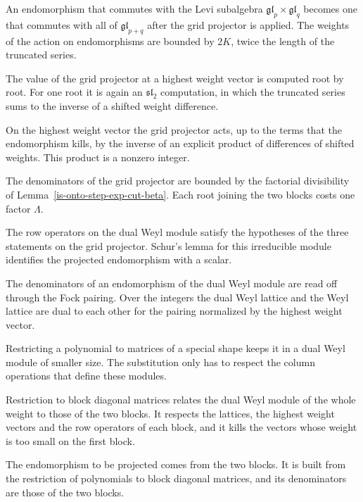 An endomorphism that commutes with the Levi subalgebra $\mathfrak{gl}_p\times\mathfrak{gl}_q$ becomes
one that commutes with all of $\mathfrak{gl}_{p+q}$ after the grid projector is applied. The weights
of the action on endomorphisms are bounded by $2K$, twice the length of the truncated series.

The value of the grid projector at a highest weight vector is computed root by root. For one root it
is again an $\mathfrak{sl}_2$ computation, in which the truncated series sums to the inverse of a
shifted weight difference.

On the highest weight vector the grid projector acts, up to the terms that the endomorphism kills, by
the inverse of an explicit product of differences of shifted weights. This product is a nonzero
integer.

The denominators of the grid projector are bounded by the factorial divisibility of
Lemma~\ref{is-onto-step-exp-cut-beta}. Each root joining the two blocks costs one factor $\Lambda$.

The row operators on the dual Weyl module satisfy the hypotheses of the three statements on the grid
projector. Schur's lemma for this irreducible module identifies the projected endomorphism with a
scalar.

The denominators of an endomorphism of the dual Weyl module are read off through the Fock pairing.
Over the integers the dual Weyl lattice and the Weyl lattice are dual to each other for the pairing
normalized by the highest weight vector.

Restricting a polynomial to matrices of a special shape keeps it in a dual Weyl module of smaller
size. The substitution only has to respect the column operations that define these modules.

Restriction to block diagonal matrices relates the dual Weyl module of the whole weight to those of
the two blocks. It respects the lattices, the highest weight vectors and the row operators of each
block, and it kills the vectors whose weight is too small on the first block.

The endomorphism to be projected comes from the two blocks. It is built from the restriction of
polynomials to block diagonal matrices, and its denominators are those of the two blocks.

